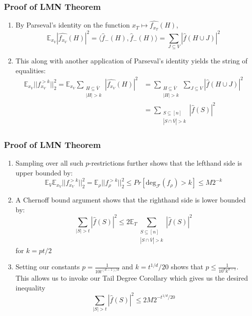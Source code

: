 \documentclass{beamer}
\begin{document}
\begin{frame}
  \frametitle{Proof of LMN Theorem}
  \begin{enumerate}
    \item By Parseval's identity on the function $x_T \mapsto \widehat{f_{x_T}}(H)$,
    \begin{equation}
      \mathbb{E}_{x_V}|\widehat{f_{x_V}}(H)|^2 = \langle \hat{f}_{-}(H), \hat{f}_{-}(H) \rangle = \sum_{J \subseteq V} |\hat{f}(H \cup J)|^2
    \end{equation}
    \pause
    \item
    This along with another application of Parseval's identity yields the string of equalities: \newline
    \begin{align}
      \mathbb{E}_{x_V}||f^{>k}_{x_V}||_2^2 = \mathbb{E}_{x_V}\sum_{\substack {H \subseteq \overline{V} \\ |H| > k}} |\widehat{f_{x_V}}(H)|^2
       & = \sum_{\substack {H \subseteq \overline{V} \\ |H| > k}} \sum_{J \subseteq V} |\hat{f}(H \cup J)|^2 \\
       & = \sum_{ \substack {S \subseteq [n] \\ |S \cap \overline{V}| > k}} |\hat{f}(S)|^2
    \end{align}
  \end{enumerate}
\end{frame}

\begin{frame}
  \frametitle{Proof of LMN Theorem}
  \begin{enumerate}
    \item Sampling over all such $p$-restrictions further shows that the lefthand side is upper bounded by:
    \begin{equation*} \label{coroinvoke}
      \mathbb{E}_V\mathbb{E}_{x_V} ||f^{>k}_{x_V}||_2^2 = \mathbb{E}_{\rho} ||f^{>k}_{\rho}||_2^2 \leq Pr[\text{deg}_{\mathcal{F}}(f_\rho) > k] \leq M2^{-k}
    \end{equation*}
    \pause
    \item A Chernoff bound argument shows that the righthand side is lower bounded by:
    $$ \sum_{|S| > t} |\hat{f}(S)|^2 \leq 2 \mathbb{E}_T \sum_{ \substack {S \subseteq [n] \\ |S \cap \overline{V}| > k}} |\hat{f}(S)|^2 $$
    for $k = pt/2$
    \pause
    \item Setting our constants $p = \frac{1}{10t^{(d-1)/d}}$ and $k = t^{1/d}/20$ shows that $p \leq \frac{1}{10^dk^{d-1}}$. This allows us to invoke our Tail Degree Corollary which gives us the desired inequality
    \begin{equation}
      \sum_{|S| > t} |\hat{f}(S)|^2 \leq 2M2^{-t^{1/d}/20}
    \end{equation}
  \end{enumerate}
\end{frame}
\end{document}
